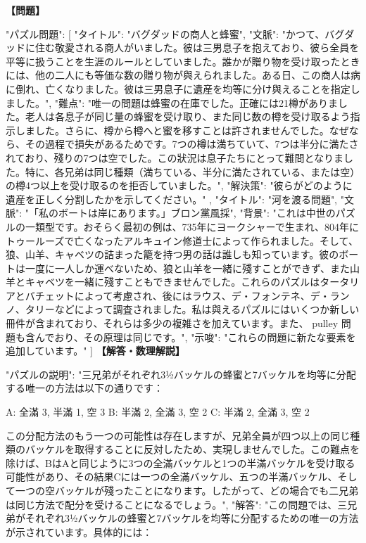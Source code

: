 \documentclass[10pt,a4paper,oneside,openany]{ltjsbook}
\begin{document}
\begin{tcolorbox}[colback=softblue,colframe=primaryblue,title=\textbf{第 372 問：THE BARRELS OF HONEY.},arc=2mm,boxrule=1pt,breakable]
\textbf{【問題】}\par\vspace{0.3em}
{
  "パズル問題": [
    {
      "タイトル": "バグダッドの商人と蜂蜜",
      "文脈": "かつて、バグダッドに住む敬愛される商人がいました。彼は三男息子を抱えており、彼ら全員を平等に扱うことを生涯のルールとしていました。誰かが贈り物を受け取ったときには、他の二人にも等価な数の贈り物が與えられました。ある日、この商人は病に倒れ、亡くなりました。彼は三男息子に遺産を均等に分け與えることを指定しました。",
      "難点": "唯一の問題は蜂蜜の在庫でした。正確には21樽がありました。老人は各息子が同じ量の蜂蜜を受け取り、また同じ数の樽を受け取るよう指示しました。さらに、樽から樽へと蜜を移すことは許されませんでした。なぜなら、その過程で損失があるためです。7つの樽は満ちていて、7つは半分に満たされており、殘りの7つは空でした。この狀況は息子たちにとって難問となりました。特に、各兄弟は同じ種類（満ちている、半分に満たされている、または空）の樽4つ以上を受け取るのを拒否していました。",
      "解決策": "彼らがどのように遺産を正しく分割したかを示してください。"
    },
    {
      "タイトル": "河を渡る問題",
      "文脈": "「私のボートは岸にあります。」ブロン黨風採",
      "背景": "これは中世のパズルの一類型です。おそらく最初の例は、735年にヨークシャーで生まれ、804年にトゥールーズで亡くなったアルキュイン修道士によって作られました。そして、狼、山羊、キャベツの詰まった籠を持つ男の話は誰しも知っています。彼のボートは一度に一人しか運べないため、狼と山羊を一緒に殘すことができず、また山羊とキャベツを一緒に殘すこともできませんでした。これらのパズルはタータリアとバチェットによって考慮され、後にはラウス、デ・フォンテネ、デ・ランノ、タリーなどによって調査されました。私は與えるパズルにはいくつか新しい冊件が含まれており、それらは多少の複雑さを加えています。また、 pulley 問題も含んでおり、その原理は同じです。",
      "示唆": "これらの問題に新たな要素を追加しています。"
    }
  ]
}
\tcblower
\textbf{【解答・数理解説】}\par\vspace{0.3em}
{
  "パズルの説明": "三兄弟がそれぞれ3½バッケルの蜂蜜と7バッケルを均等に分配する唯一の方法は以下の通りです：

    A: 全滿 3, 半滿 1, 空 3
    B: 半滿 2, 全滿 3, 空 2
    C: 半滿 2, 全滿 3, 空 2

この分配方法のもう一つの可能性は存在しますが、兄弟全員が四つ以上の同じ種類のバッケルを取得することに反対したため、実現しませんでした。この難点を除けば、BはAと同じように3つの全滿バッケルと1つの半滿バッケルを受け取る可能性があり、その結果Cには一つの全滿バッケル、五つの半滿バッケル、そして一つの空バッケルが殘ったことになります。したがって、どの場合でも二兄弟は同じ方法で配分を受けることになるでしょう。",
  "解答": "この問題では、三兄弟がそれぞれ3½バッケルの蜂蜜と7バッケルを均等に分配するための唯一の方法が示されています。具体的には：

}
\end{tcolorbox}
\end{document}

